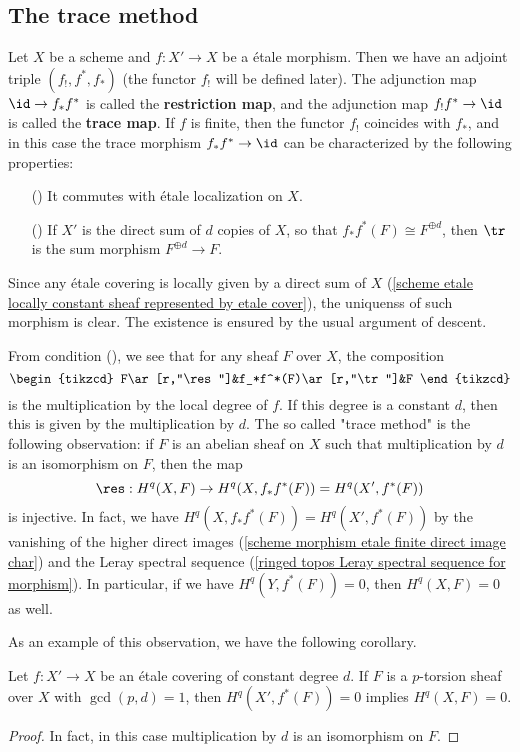 \subsection{The trace method}
Let $X$ be a scheme and $f:X'\to X$ be a \'etale morphism. Then we have an adjoint triple $(f_!,f^*,f_*)$ (the functor $f_!$ will be defined later). The adjunction map $\id\to f_*f^*$ is called the \textbf{restriction map}, and the adjunction map $f_!f^*\to\id$ is called the \textbf{trace map}. If $f$ is finite, then the functor $f_!$ coincides with $f_*$, and in this case the trace morphism $f_*f^*\to\id$ can be characterized by the following properties:
\begin{enumerate}
    \item[(\rmnum{1})] It commutes with \'etale localization on $X$.
    \item[(\rmnum{2})] If $X'$ is the direct sum of $d$ copies of $X$, so that $f_*f^*(F)\cong F^{\oplus d}$, then $\tr$ is the sum morphism $F^{\oplus d}\to F$.
\end{enumerate}
Since any \'etale covering is locally given by a direct sum of $X$ (\cref{scheme etale locally constant sheaf represented by etale cover}), the uniquenss of such morphism is clear. The existence is ensured by the usual argument of descent.\par
From condition (), we see that for any sheaf $F$ over $X$, the composition
\[\begin{tikzcd}
F\ar[r,"\res"]&f_*f^*(F)\ar[r,"\tr"]&F
\end{tikzcd}\]
is the multiplication by the local degree of $f$. If this degree is a constant $d$, then this is given by the multiplication by $d$. The so called "trace method" is the following observation: if $F$ is an abelian sheaf on $X$ such that multiplication by $d$ is an isomorphism on $F$, then the map
\[\res:H^q(X,F)\to H^q(X,f_*f^*(F))=H^q(X',f^*(F))\]
is injective. In fact, we have $H^q(X,f_*f^*(F))=H^q(X',f^*(F))$ by the vanishing of the higher direct images (\cref{scheme morphism etale finite direct image char}) and the Leray spectral sequence (\cref{ringed topos Leray spectral sequence for morphism}). In particular, if we have $H^q(Y,f^*(F))=0$, then $H^q(X,F)=0$ as well.\par
As an example of this observation, we have the following corollary.
\begin{corollary}\label{scheme p-torsion etale sheaf trace method}
Let $f:X'\to X$ be an \'etale covering of constant degree $d$. If $F$ is a $p$-torsion sheaf over $X$ with $\gcd(p,d)=1$, then $H^q(X',f^*(F))=0$ implies $H^q(X,F)=0$.
\end{corollary}
\begin{proof}
In fact, in this case multiplication by $d$ is an isomorphism on $F$.
\end{proof}


